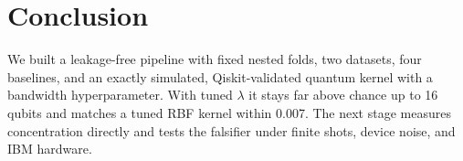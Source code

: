 \documentclass[conference]{IEEEtran}
\begin{document}
\section{Conclusion}
We built a leakage-free pipeline with fixed nested folds, two datasets, four baselines, and an exactly simulated, Qiskit-validated quantum kernel with a bandwidth hyperparameter. With tuned $\lambda$ it stays far above chance up to 16 qubits and matches a tuned RBF kernel within 0.007. The next stage measures concentration directly and tests the falsifier under finite shots, device noise, and IBM hardware.



\end{document}
